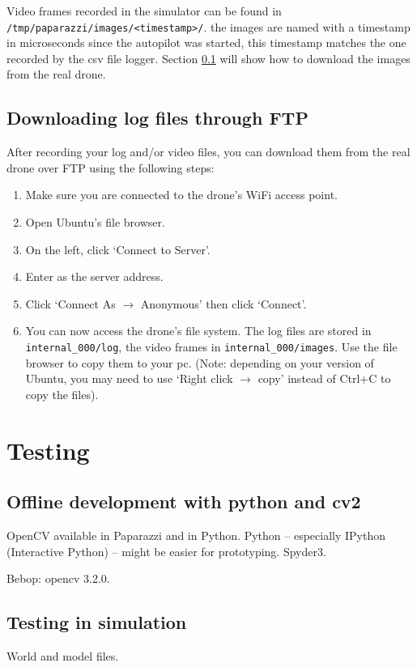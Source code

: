 \documentclass{article}
\begin{document}
Video frames recorded in the simulator can be found in \texttt{/tmp/paparazzi/images/<timestamp>/}. the images are named with a timestamp in microseconds since the autopilot was started, this timestamp matches the one recorded by the csv file logger. Section \ref{sec:ftp} will show how to download the images from the real drone.


\subsection{Downloading log files through FTP}\label{sec:ftp}
After recording your log and/or video files, you can download them from the real drone over FTP using the following steps:
\begin{enumerate}
\item Make sure you are connected to the drone's WiFi access point.
\item Open Ubuntu's file browser.
\item On the left, click `Connect to Server'.
\item Enter  as the server address.
\item Click `Connect As $\rightarrow$ Anonymous' then click `Connect'.
\item You can now access the drone's file system. The log files are stored in \texttt{internal\_000/log}, the video frames in \texttt{internal\_000/images}. Use the file browser to copy them to your pc. (Note: depending on your version of Ubuntu, you may need to use `Right click $\rightarrow$ copy' instead of Ctrl+C to copy the files).
\end{enumerate}



\section{Testing}
\subsection{Offline development with python and cv2}
OpenCV available in Paparazzi and in Python. Python -- especially IPython (Interactive Python) -- might be easier for prototyping. Spyder3.

Bebop: opencv 3.2.0.

\subsection{Testing in simulation}
World and model files.
\end{document}
